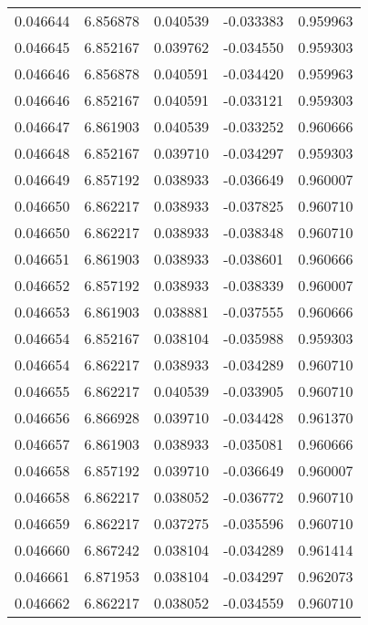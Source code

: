 \begin{tabular}{lrrrr}
0.046644    &  6.856878 &  0.040539 & -0.033383 &             0.959963 \\
0.046645    &  6.852167 &  0.039762 & -0.034550 &             0.959303 \\
0.046646    &  6.856878 &  0.040591 & -0.034420 &             0.959963 \\
0.046646    &  6.852167 &  0.040591 & -0.033121 &             0.959303 \\
0.046647    &  6.861903 &  0.040539 & -0.033252 &             0.960666 \\
0.046648    &  6.852167 &  0.039710 & -0.034297 &             0.959303 \\
0.046649    &  6.857192 &  0.038933 & -0.036649 &             0.960007 \\
0.046650    &  6.862217 &  0.038933 & -0.037825 &             0.960710 \\
0.046650    &  6.862217 &  0.038933 & -0.038348 &             0.960710 \\
0.046651    &  6.861903 &  0.038933 & -0.038601 &             0.960666 \\
0.046652    &  6.857192 &  0.038933 & -0.038339 &             0.960007 \\
0.046653    &  6.861903 &  0.038881 & -0.037555 &             0.960666 \\
0.046654    &  6.852167 &  0.038104 & -0.035988 &             0.959303 \\
0.046654    &  6.862217 &  0.038933 & -0.034289 &             0.960710 \\
0.046655    &  6.862217 &  0.040539 & -0.033905 &             0.960710 \\
0.046656    &  6.866928 &  0.039710 & -0.034428 &             0.961370 \\
0.046657    &  6.861903 &  0.038933 & -0.035081 &             0.960666 \\
0.046658    &  6.857192 &  0.039710 & -0.036649 &             0.960007 \\
0.046658    &  6.862217 &  0.038052 & -0.036772 &             0.960710 \\
0.046659    &  6.862217 &  0.037275 & -0.035596 &             0.960710 \\
0.046660    &  6.867242 &  0.038104 & -0.034289 &             0.961414 \\
0.046661    &  6.871953 &  0.038104 & -0.034297 &             0.962073 \\
0.046662    &  6.862217 &  0.038052 & -0.034559 &             0.960710 \\

\end{tabular}
